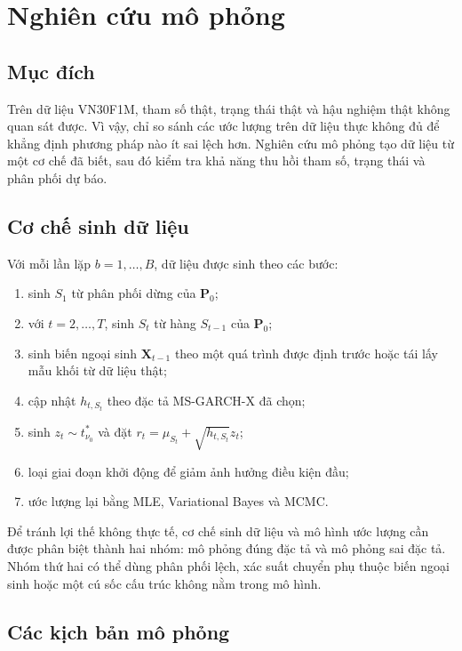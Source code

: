 \documentclass[12pt,a4paper]{article}
\numberwithin{equation}{section}
\newcommand{\bm}[1]{\symbf{#1}}
\newcommand{\Xvec}{\bm{X}}
\newcommand{\Pmat}{\bm{P}}
\begin{document}
\section{Nghiên cứu mô phỏng}\label{sec:mo-phong}

\subsection{Mục đích}\label{subsec:simulation-purpose}

Trên dữ liệu VN30F1M, tham số thật, trạng thái thật và hậu nghiệm thật không quan sát được. Vì vậy, chỉ so sánh các ước lượng trên dữ liệu thực không đủ để khẳng định phương pháp nào ít sai lệch hơn. Nghiên cứu mô phỏng tạo dữ liệu từ một cơ chế đã biết, sau đó kiểm tra khả năng thu hồi tham số, trạng thái và phân phối dự báo.

\subsection{Cơ chế sinh dữ liệu}\label{subsec:dgp}

Với mỗi lần lặp $b=1,\ldots,B$, dữ liệu được sinh theo các bước:
\begin{enumerate}
  \item sinh $S_1$ từ phân phối dừng của $\Pmat_0$;
  \item với $t=2,\ldots,T$, sinh $S_t$ từ hàng $S_{t-1}$ của $\Pmat_0$;
  \item sinh biến ngoại sinh $\Xvec_{t-1}$ theo một quá trình được định trước hoặc tái lấy mẫu khối từ dữ liệu thật;
  \item cập nhật $h_{t,S_t}$ theo đặc tả MS-GARCH-X đã chọn;
  \item sinh $z_t\sim t_{\nu_0}^{*}$ và đặt $r_t=\mu_{S_t}+\sqrt{h_{t,S_t}}z_t$;
  \item loại giai đoạn khởi động để giảm ảnh hưởng điều kiện đầu;
  \item ước lượng lại bằng MLE, Variational Bayes và MCMC.
\end{enumerate}

Để tránh lợi thế không thực tế, cơ chế sinh dữ liệu và mô hình ước lượng cần được phân biệt thành hai nhóm: mô phỏng đúng đặc tả và mô phỏng sai đặc tả. Nhóm thứ hai có thể dùng phân phối lệch, xác suất chuyển phụ thuộc biến ngoại sinh hoặc một cú sốc cấu trúc không nằm trong mô hình.

\subsection{Các kịch bản mô phỏng}\label{subsec:simulation-scenarios}
\end{document}
